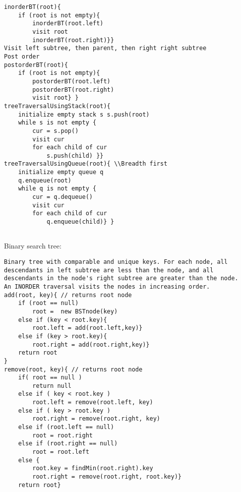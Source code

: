 \documentclass[10pt,landscape]{article}
\begin{document}
\begin{multicols}{3}
\begin{lstlisting}
inorderBT(root){  
	if (root is not empty){
		inorderBT(root.left) 
		visit root 
		inorderBT(root.right)}}
Visit left subtree, then parent, then right right subtree
Post order
postorderBT(root){  
	if (root is not empty){
		postorderBT(root.left) 
		postorderBT(root.right) 
		visit root} }
treeTraversalUsingStack(root){ 
    initialize empty stack s s.push(root)
    while s is not empty {
        cur = s.pop()
        visit cur
        for each child of cur
            s.push(child) }}
treeTraversalUsingQueue(root){ \\Breadth first
    initialize empty queue q
    q.enqueue(root)
    while q is not empty {
        cur = q.dequeue() 
        visit cur
        for each child of cur
            q.enqueue(child)} }
    
\end{lstlisting}
Binary search tree:
\begin{lstlisting}
Binary tree with comparable and unique keys. For each node, all descendants in left subtree are less than the node, and all descendants in the node's right subtree are greater than the node.
An INORDER traversal visits the nodes in increasing order.
add(root, key){ // returns root node 
    if (root == null)
        root =  new BSTnode(key)
    else if (key < root.key){
        root.left = add(root.left,key)}
    else if (key > root.key){
        root.right = add(root.right,key)}
    return root
}
remove(root, key){ // returns root node 
    if( root == null )
        return null
    else if ( key < root.key )
        root.left = remove(root.left, key) 
    else if ( key > root.key )
        root.right = remove(root.right, key) 
    else if (root.left == null)
        root = root.right
    else if (root.right == null)
        root = root.left
    else {
        root.key = findMin(root.right).key
        root.right = remove(root.right, root.key)}
    return root}
\end{lstlisting}


\end{multicols}
\end{document}
